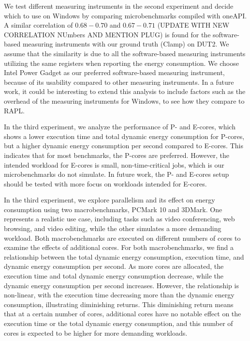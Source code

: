 
We test different measuring instruments in the second experiment and decide which to use on Windows by comparing microbenchmarks compiled with oneAPI. A similar correlation of $0.68 - 0.70$ and $0.67 - 0.71$ (UPDATE WITH NEW CORRELATION NUmbers AND MENTION PLUG) is found for the software-based measuring instruments with our ground truth (Clamp) on DUT2. We assume that the similarity is due to all the software-based measuring instruments utilizing the same registers when reporting the energy consumption. We choose Intel Power Gadget as our preferred software-based measuring instrument, because of its usability compared to other measuring instruments. In a future work, it could be interesting to extend this analysis to include factors such as the overhead of the measuring instruments for Windows, to see how they compare to RAPL.

In the third experiment, we analyze the performance of P- and E-cores, which shows a lower execution time and total dynamic energy consumption for P-cores, but a higher dynamic energy consumption per second compared to E-cores. This indicates that for most benchmarks, the P-cores are preferred. However, the intended workload for E-cores is small, non-time-critical jobs, which is our microbenchmarks do not simulate. In future work, the P- and E-cores setup should be tested with more focus on workloads intended for E-cores.

In the third experiment, we explore parallelism and its effect on energy consumption using two macrobenchmarks, PCMark 10 and 3DMark. One represents a realistic use case, including tasks such as video conferencing, web browsing, and video editing, while the other simulates a more demanding workload. Both macrobenchmarks are executed on different numbers of cores to examine the effects of additional cores. For both macrobenchmarks, we find a relationship between the total dynamic energy consumption, execution time, and dynamic energy consumption per second. As more cores are allocated, the execution time and total dynamic energy consumption decrease, while the dynamic energy consumption per second increases. However, the relationship is non-linear, with the execution time decreasing more than the dynamic energy consumption, illustrating diminishing returns. This diminishing return means that at a certain number of cores, additional cores have no notable effect on the execution time or the total dynamic energy consumption, and this number of cores is expected to be higher for more demanding workloads.


